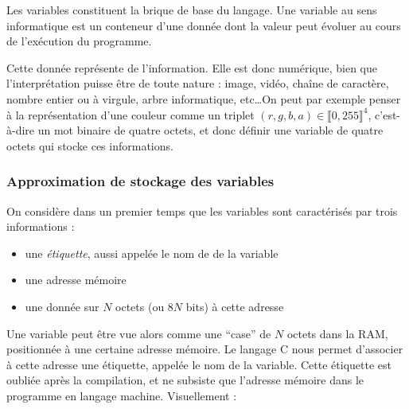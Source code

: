\documentclass[../../../main.tex]{subfiles}
\begin{document}
Les variables constituent la brique de base du langage. Une variable au sens informatique est un conteneur d'une donnée dont la valeur peut évoluer au cours de l'exécution du programme.
 
Cette donnée représente de l'information. Elle est donc numérique, bien que l'interprétation puisse être de toute nature : image, vidéo, chaîne de caractère, nombre entier ou à virgule, arbre informatique, etc\dots On peut par exemple penser à la représentation d'une couleur comme un triplet $(r, g, b, a)\in{\llbracket 0, 255\rrbracket^{4}}$, c'est-à-dire un mot binaire de quatre octets, et donc définir une variable de quatre octets qui stocke ces informations.
 
\subsubsection{Approximation de stockage des variables}
 
On considère dans un premier temps que les variables sont caractérisés par trois informations :
\begin{itemize}
	\item une \textit{étiquette}, aussi appelée le nom de de la variable
	\item une adresse mémoire
	\item une donnée sur $N$ octets (ou $8N$ bits) à cette adresse
\end{itemize}
Une variable peut être vue alors comme une ``case'' de $N$ octets dans la RAM, positionnée à une certaine adresse mémoire. Le langage C nous permet d'associer à cette adresse une étiquette, appelée le nom de la variable. Cette étiquette est oubliée après la compilation, et ne subsiste que l'adresse mémoire dans le programme en langage machine.\newline
Visuellement :

\begin{minipage}{\textwidth}
	\begin{center}
		
		\label{img:variable}
	\end{center}
\end{minipage}
 
\end{document}
